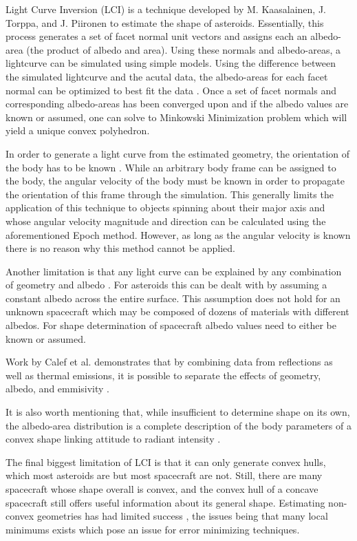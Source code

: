 \documentclass{article}
\begin{document}
Light Curve Inversion (LCI) is a technique developed by M. Kaasalainen, J. Torppa, and J. Piironen \cite{KAASALAINEN2002369} to estimate the shape of asteroids. Essentially, this process generates a set of facet normal unit vectors and assigns each an albedo-area (the product of albedo and area). Using these normals and albedo-areas, a lightcurve can be simulated using simple models. Using the difference between the simulated lightcurve and the acutal data, the albedo-areas for each facet normal can be optimized to best fit the data \cite{Kaasalainen}. Once a set of facet normals and corresponding albedo-areas has been converged upon and if the albedo values are known or assumed, one can solve to Minkowski Minimization problem \cite{Minkowski1989} which will yield a unique convex polyhedron.

In order to generate a light curve from the estimated geometry, the orientation of the body has to be known \cite{PSI}. While an arbitrary body frame can be assigned to the body, the angular velocity of the body must be known in order to propagate the orientation of this frame through the simulation. This generally limits the application of this technique to objects spinning about their major axis and whose angular velocity magnitude and direction can be calculated using the aforementioned Epoch method. However, as long as the angular velocity is known there is no reason why this method cannot be applied.

Another limitation is that any light curve can be explained by any combination of geometry and albedo \cite{Magnusson1989DeterminationOP}. For asteroids this can be dealt with by assuming a constant albedo across the entire surface. This assumption does not hold for an unknown spacecraft which may be composed of dozens of materials with different albedos. For shape determination of spacecraft albedo values need to either be known or assumed. 

Work by Calef et al. \cite{Separating} demonstrates that by combining data from reflections as well as thermal emissions, it is possible to separate the effects of geometry, albedo, and emmisivity \cite{PSI}. 

It is also worth mentioning that, while insufficient to determine shape on its own, the albedo-area distribution is a complete description of the body parameters of a convex shape linking attitude to radiant intensity \cite{Separating}.

The final biggest limitation of LCI is that it can only generate convex hulls, which most asteroids are but most spacecraft are not. Still, there are many spacecraft whose shape overall is convex, and the convex hull of a concave spacecraft still offers useful information about its general shape. Estimating non-convex geometries has had limited success \cite{Kaasalainen}, the issues being that many local minimums exists which pose an issue for error minimizing techniques.
\end{document}

